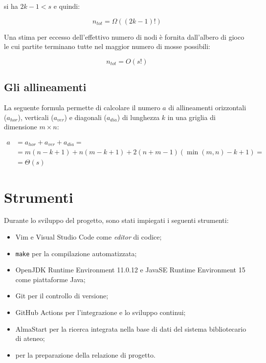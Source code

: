 \documentclass{article}
\begin{document}
si ha $2k - 1 < s$ e quindi:

\begin{equation}
  n_{tot} = \varOmega((2k - 1)!)
\end{equation}

Una stima per eccesso dell'effettivo numero di nodi è fornita dall'albero di
gioco le cui partite terminano tutte nel maggior numero di mosse possibili:

\begin{equation}
  n_{tot} = O(s!)
\end{equation}

\subsection{Gli allineamenti}

La seguente formula permette di calcolare il numero $a$ di allineamenti
orizzontali ($a_{hor}$), verticali ($a_{ver}$) e diagonali ($a_{dia}$) di
lunghezza $k$ in una griglia di dimensione $m \times n$:

\begin{equation}
\begin{split}
  a & = a_{hor} + a_{ver} + a_{dia} = \\
  & = m (n - k + 1) + n (m - k + 1) + 2 (n + m - 1) (\min(m, n) - k + 1) = \\
  & = \varTheta(s)
\end{split}
\end{equation}

\section{Strumenti}

Durante lo sviluppo del progetto, sono stati impiegati i seguenti strumenti:

\begin{itemize}
  \item Vim e Visual Studio Code come \emph{editor} di codice;
  \item \verb!make! per la compilazione automatizzata; 
  \item OpenJDK Runtime Environment 11.0.12 e Java\texttrademark SE Runtime Environment 15 come piattaforme Java;
  \item Git per il controllo di versione;
  \item GitHub Actions per l'integrazione e lo sviluppo continui;
  \item AlmaStart per la ricerca integrata nella base di dati del sistema bibliotecario di ateneo;
  \item \LaTeXe{} per la preparazione della relazione di progetto.
\end{itemize}
\end{document}
